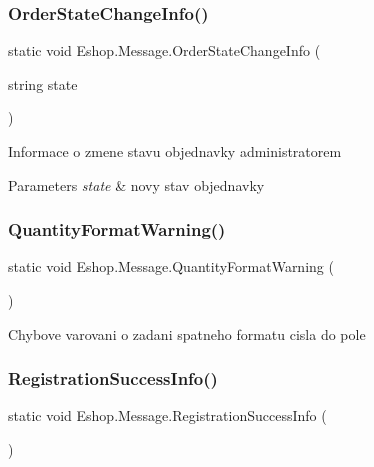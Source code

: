 \subsubsection{\texorpdfstring{OrderStateChangeInfo()}{OrderStateChangeInfo()}}
{\footnotesize\ttfamily static void Eshop.\+Message.\+Order\+State\+Change\+Info (\begin{DoxyParamCaption}\item[{string}]{state }\end{DoxyParamCaption})\hspace{0.3cm}{\ttfamily [static]}}



Informace o zmene stavu objednavky administratorem 


\begin{DoxyParams}{Parameters}
{\em state} & novy stav objednavky\\
\hline
\end{DoxyParams}
\mbox{\label{class_eshop_1_1_message_a5f220c2649c5747b92eacf54ec271a24}} 
\subsubsection{\texorpdfstring{QuantityFormatWarning()}{QuantityFormatWarning()}}
{\footnotesize\ttfamily static void Eshop.\+Message.\+Quantity\+Format\+Warning (\begin{DoxyParamCaption}{ }\end{DoxyParamCaption})\hspace{0.3cm}{\ttfamily [static]}}



Chybove varovani o zadani spatneho formatu cisla do pole 

\mbox{\label{class_eshop_1_1_message_ad51bfaf42591c9b99562d18493cd0941}} 
\subsubsection{\texorpdfstring{RegistrationSuccessInfo()}{RegistrationSuccessInfo()}}
{\footnotesize\ttfamily static void Eshop.\+Message.\+Registration\+Success\+Info (\begin{DoxyParamCaption}{ }\end{DoxyParamCaption})\hspace{0.3cm}{\ttfamily [static]}}



